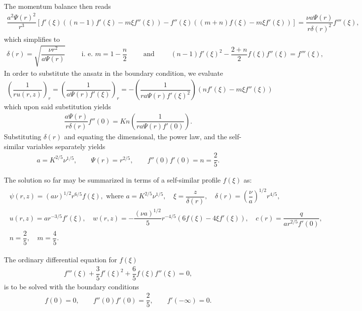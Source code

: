 \documentclass[aps, floatfix, superscriptaddress]{revtex4}
\begin{document}
The momentum balance then reads
\begin{align}
 \dfrac{a^2  \Psi(r)^2}{r^3} \left[ f'(\xi) ((n-1) f'(\xi) - {m \xi} f''(\xi) )  - f''(\xi) ( (m+n) f(\xi) - {m\xi} f'(\xi) ) \right] = \dfrac{\nu a \Psi(r) }{ r\delta(r)^2} f'''(\xi),
\end{align}
which simplifies to
\begin{align}
\delta(r) = \sqrt{\dfrac{\nu r^2}{a \Psi(r)} } \qquad \text{ i. e. } m = 1-\dfrac{n}{2} \qquad \text{ and } \qquad  (n-1) f'(\xi)^2  -  \dfrac{2+n}{2} f(\xi)f''(\xi) = f'''(\xi),
\end{align}
In order to substitute the ansatz in the boundary condition, we evaluate
\begin{align}
 \left( \dfrac{1}{r u(r, z)} \right)_r = \left( \dfrac{1}{a \Psi(r) f'(\xi)} \right)_r = -\left( \dfrac{1}{r a \Psi(r) f'(\xi)^2} \right) \left( n f'(\xi) - {m\xi} f''(\xi) \right)
\end{align}
which upon said substitution yields
\begin{align}
 \dfrac{a \Psi(r)}{r \delta(r)} f''(0) = Kn \left( \dfrac{1}{r a \Psi(r) f'(0)} \right).
\end{align}
Substituting $\delta(r)$ and equating the dimensional, the power law, and the self-similar variables separately yields
\begin{align}
a = K^{2/5} \nu^{1/5}, \qquad \Psi(r) = r^{2/5}, \qquad f''(0) f'(0) = n = \dfrac{2}{5}.
\end{align}

\vspace{3mm}
The solution so far may be summarized in terms of a self-similar profile $f(\xi)$ as:
\begin{align}
\begin{split}
 \psi(r,z) = (a \nu)^{1/2} r^{6/5} f(\xi), \text{ where } a=K^{2/5} \nu^{1/5}, \quad \xi = \dfrac{z}{\delta(r)}, \quad \delta(r) = \left( \dfrac{\nu }{a }\right)^{1/2} r^{4/5}, \\
 u(r,z) = ar^{-3/5} f'(\xi), \quad w(r,z) = -\dfrac{ (\nu a)^{1/2} }{5} r^{-4/5}  \left( 6f(\xi) - 4\xi f'(\xi)\right), \quad c(r) = \dfrac{q}{a r^{2/5} f'(0)}, \\
 n=\dfrac{2}{5}, \quad m = \dfrac{4}{5}.
\end{split}
\end{align}

The ordinary differential equation for $f(\xi)$
\begin{align}
 f'''(\xi) +  \dfrac{3}{5} f'(\xi)^2  +  \dfrac{6}{5} f(\xi)f''(\xi) = 0,
\label{eqn:selfsimilarode}
\end{align}
is to be solved with the boundary conditions
\begin{align}
 f(0) = 0, \qquad f''(0) f'(0) = \dfrac{2}{5}, \qquad f'(-\infty) = 0.
\label{eqn:selfsimilarbc}
\end{align}
\end{document}
